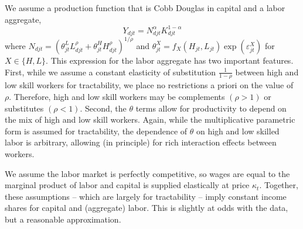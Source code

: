 \documentclass{article}
\begin{document}
We assume a production function that is Cobb Douglas in capital and a labor aggregate,
\begin{equation}\label{eq_prod_fn}
    Y_{djt} = N_{djt}^\alpha K_{djt}^{1-\alpha}
\end{equation}
where $N_{djt}=(\theta_{jt}^L L_{djt}^\rho + \theta_{jt}^H H_{djt}^\rho)^{1/\rho}$ and $\theta_{jt}^X = f_X(H_{jt},L_{jt})\exp(\varepsilon_{jt}^X)$ for $X\in\{H,L\}$. 
This expression for the labor aggregate has two important features. First, while we assume a constant elasticity of substitution $\frac{1}{1-\rho}$ between high and low skill workers for tractability, we place no restrictions a priori on the value of $\rho$. Therefore, high and low skill workers may be complements $(\rho >1)$ or substitutes $(\rho <1)$. Second, the $\theta$ terms allow for productivity to depend on the mix of high and low skill workers. Again, while the multiplicative parametric form is assumed for tractability, the dependence of $\theta$ on high and low skilled labor is arbitrary, allowing (in principle) for rich interaction effects between workers.


We assume the labor market is perfectly competitive, so wages are equal to the marginal product of labor and capital is supplied elastically at price $\kappa_t$. Together, these assumptions -- which are largely for tractability --  imply constant income shares for capital and (aggregate) labor. This is slightly at odds with the data, but a reasonable approximation.
\end{document}
